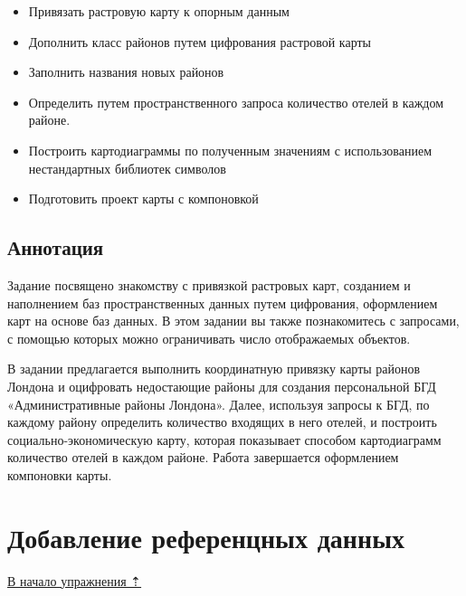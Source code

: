 \documentclass[12pt,]{book}
\providecommand{\tightlist}{%
  \setlength{\itemsep}{0pt}\setlength{\parskip}{0pt}}
\begin{document}
\begin{itemize}
\tightlist
\item
  Привязать растровую карту к опорным данным
\item
  Дополнить класс районов путем цифрования растровой карты
\item
  Заполнить названия новых районов
\item
  Определить путем пространственного запроса количество отелей в каждом районе.
\item
  Построить картодиаграммы по полученным значениям с использованием нестандартных библиотек символов
\item
  Подготовить проект карты с компоновкой
\end{itemize}

\hypertarget{map-ref-economic-annotation}{%
\subsection{Аннотация}\label{map-ref-economic-annotation}}

Задание посвящено знакомству с привязкой растровых карт, созданием и наполнением баз пространственных данных путем цифрования, оформлением карт на основе баз данных. В этом задании вы также познакомитесь с запросами, с помощью которых можно ограничивать число отображаемых объектов.

В задании предлагается выполнить координатную привязку карты районов Лондона и оцифровать недостающие районы для создания персональной БГД «Административные районы Лондона». Далее, используя запросы к БГД, по каждому району определить количество входящих в него отелей, и построить социально-экономическую карту, которая показывает способом картодиаграмм количество отелей в каждом районе. Работа завершается оформлением компоновки карты.

\hypertarget{map-ref-economic-reference}{%
\section{Добавление референцных данных}\label{map-ref-economic-reference}}

\protect\hyperlink{map-ref-economic}{В начало упражнения ⇡}
\end{document}
